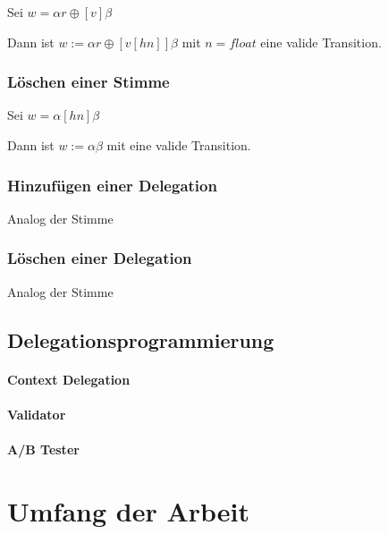 \documentclass[]{article}
\begin{document}
Sei $w=\alpha r\oplus [v]\beta$

Dann ist $w:=\alpha r \oplus [v[h n]]\beta$ mit $n=float$ eine valide
Transition.

\subsubsection*{Löschen einer Stimme}

Sei $w=\alpha [hn]\beta$

Dann ist $w:=\alpha\beta$ mit eine valide Transition.

\subsubsection*{Hinzufügen einer Delegation}
Analog der Stimme

\subsubsection*{Löschen einer Delegation}
Analog der Stimme

\subsection{Delegationsprogrammierung}

\paragraph{Context Delegation}
\paragraph{Validator}
\paragraph{A/B Tester}

\section{Umfang der Arbeit}
\end{document}
